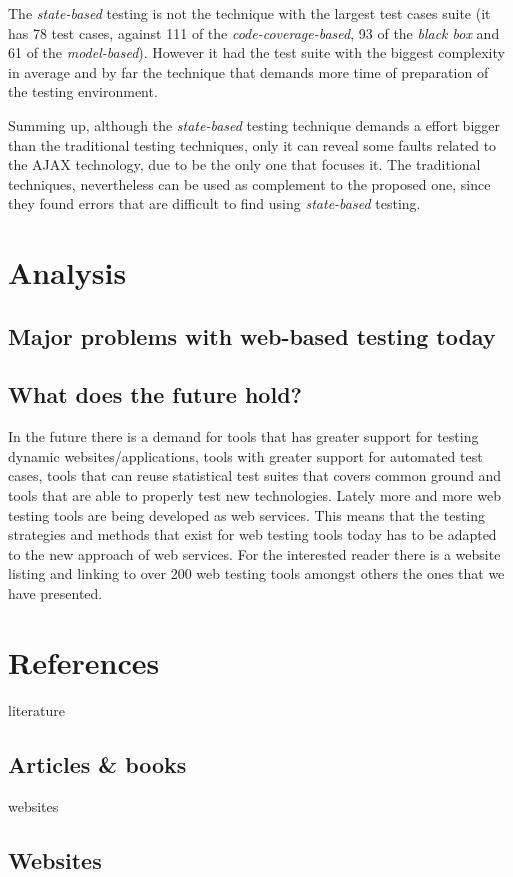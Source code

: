 \documentclass[a4paper]{article}
\begin{document}
The \emph{state-based} testing is not the technique with the largest test cases suite (it has 78 test cases, against 111 of the \emph{code-coverage-based}, 93 of the \emph{black box} and 61 of the \emph{model-based}).
However it had the test suite with the biggest complexity in average and by far the technique that demands more time of preparation of the testing environment.

Summing up, although the \emph{state-based} testing technique demands a effort bigger than the traditional testing techniques, only it can reveal some faults related to the AJAX technology, due to be the only one that focuses it.
The traditional techniques, nevertheless can be used as complement to the proposed one, since they found errors that are difficult to find using \emph{state-based} testing.


\section{Analysis}

\subsection{Major problems with web-based testing today}

\subsection{What does the future hold?}

In the future there is a demand for tools that has greater support for testing dynamic websites/applications, tools 
with greater support for automated test cases, tools that can reuse statistical test suites that covers common ground 
and tools that are able to properly test new technologies. Lately more and more web testing tools are being developed
as web services. This means that the testing strategies and methods that exist for web testing tools today has to be 
adapted to the new approach of web services.\cite{dlf07} For the interested reader there is a website listing and linking to over
200 web testing tools amongst others the ones that we have presented. \cite{softqa}


\newpage
\appendix

\section{References}

\begin{btSect}[alpha]{literature}
\subsection{Articles \& books}
\btPrintAll
\end{btSect}

\begin{btSect}[alpha]{websites}
\subsection{Websites}
\btPrintAll
\end{btSect}
\end{document}
